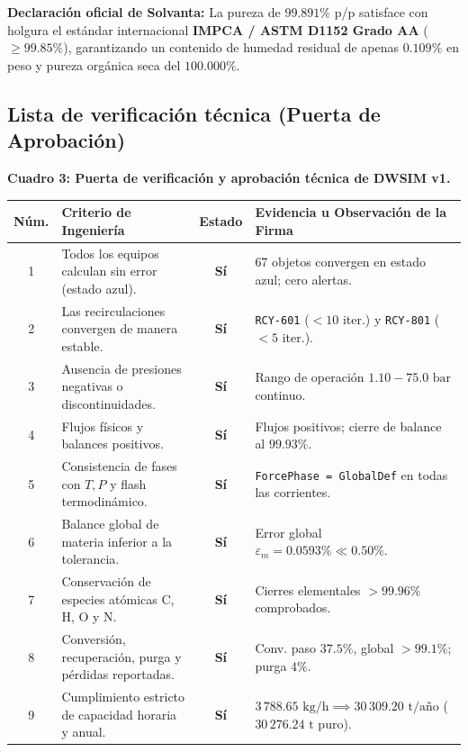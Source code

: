 \documentclass[11pt,letterpaper]{article}
\begin{document}
\textbf{Declaración oficial de Solvanta:} La pureza de $99.891\%$ p/p satisface con holgura el estándar internacional \textbf{IMPCA / ASTM D1152 Grado AA} ($\ge 99.85\%$), garantizando un contenido de humedad residual de apenas $0.109\%$ en peso y pureza orgánica seca del $100.000\%$.

\clearpage

\subsection{Lista de verificación técnica (Puerta de Aprobación)}

\begin{center}
\footnotesize
\textbf{Cuadro 3: Puerta de verificación y aprobación técnica de DWSIM v1.}\\[2pt]
\begin{tabularx}{\textwidth}{cp{7.2cm}cX}
\toprule
\textbf{Núm.} & \textbf{Criterio de Ingeniería} & \textbf{Estado} & \textbf{Evidencia u Observación de la Firma} \\
\midrule
1 & Todos los equipos calculan sin error (estado azul). & \textbf{Sí} & 67 objetos convergen en estado azul; cero alertas. \\
2 & Las recirculaciones convergen de manera estable. & \textbf{Sí} & \texttt{RCY-601} ($<10$ iter.) y \texttt{RCY-801} ($<5$ iter.). \\
3 & Ausencia de presiones negativas o discontinuidades. & \textbf{Sí} & Rango de operación $1.10 - 75.0\text{ bar}$ continuo. \\
4 & Flujos físicos y balances positivos. & \textbf{Sí} & Flujos positivos; cierre de balance al $99.93\%$. \\
5 & Consistencia de fases con $T, P$ y flash termodinámico. & \textbf{Sí} & \texttt{ForcePhase = GlobalDef} en todas las corrientes. \\
6 & Balance global de materia inferior a la tolerancia. & \textbf{Sí} & Error global $\varepsilon_m = 0.0593\% \ll 0.50\%$. \\
7 & Conservación de especies atómicas C, H, O y N. & \textbf{Sí} & Cierres elementales $>99.96\%$ comprobados. \\
8 & Conversión, recuperación, purga y pérdidas reportadas. & \textbf{Sí} & Conv. paso $37.5\%$, global $>99.1\%$; purga $4\%$. \\
9 & Cumplimiento estricto de capacidad horaria y anual. & \textbf{Sí} & $3\,788.65\text{ kg/h} \implies 30\,309.20\text{ t/año}$ ($30\,276.24\text{ t puro}$). \\

\end{tabularx}
\end{center}
\end{document}
